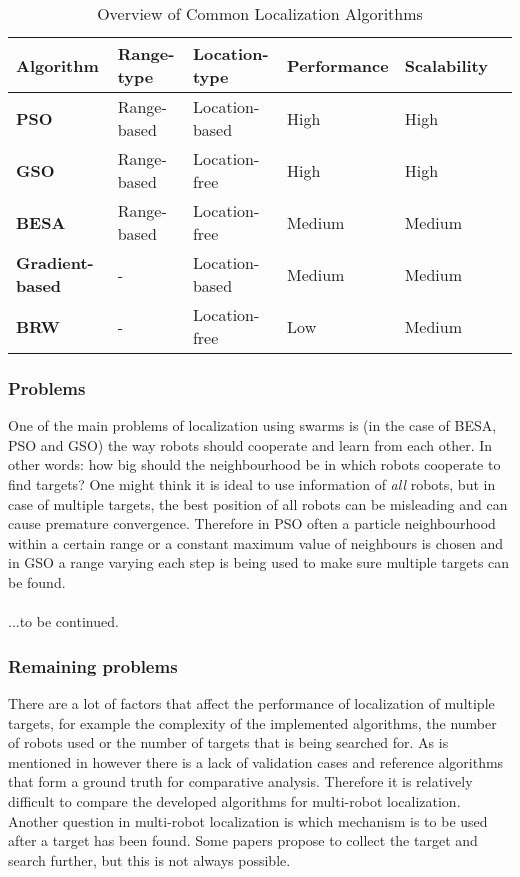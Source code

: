 	\begin{table}[H]
  \renewcommand{\arraystretch}{1.3}
  \caption{Overview of Common Localization Algorithms}
  \label{table_alg_localization}
  \centering
    \begin{tabular}{|l|l|l|l|l|l|}
    \hline
    \bfseries Algorithm & Range-type & Location-type & Performance & Scalability\\
    \hline
    \bfseries PSO & Range-based & Location-based & High & High\\
    \hline
    \bfseries GSO & Range-based & Location-free & High & High\\
    \hline
    \bfseries BESA & Range-based & Location-free & Medium & Medium\\
    \hline
    \bfseries Gradient-based & - & Location-based & Medium & Medium\\
    \hline
    \bfseries BRW & - & Location-free & Low & Medium\\
    \hline
    \end{tabular}
  \end{table}

	\subsubsection{Problems}
	One of the main problems of localization using swarms is (in the case of BESA, PSO and GSO) the way robots should cooperate and learn from each other. In other words: how big should the neighbourhood be in which robots cooperate to find targets? One might think it is ideal to use information of \emph{all} robots, but in case of multiple targets, the best position of all robots can be misleading and can cause premature convergence. Therefore in PSO often a particle neighbourhood within a certain range or a constant maximum value of neighbours is chosen and in GSO a range varying each step is being used to make sure multiple targets can be found.\\
	\\
	...to be continued.

	\subsubsection{Remaining problems}
	There are a lot of factors that affect the performance of localization of multiple targets, for example the complexity of the implemented algorithms, the number of robots used or the number of targets that is being searched for. As is mentioned in \cite{mcgill2011robot} however there is a lack of validation cases and reference algorithms that form a ground truth for comparative analysis. Therefore it is relatively difficult to compare the developed algorithms for multi-robot localization. Another question in multi-robot localization is which mechanism is to be used after a target has been found. Some papers propose to collect the target and search further, but this is not always possible.